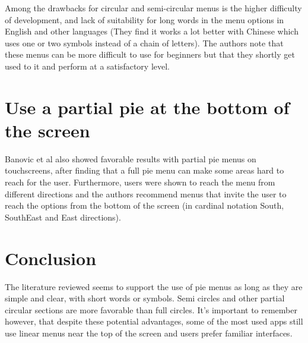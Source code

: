 \documentclass{article}
\begin{document}
Among the drawbacks for circular and semi-circular menus is the higher difficulty of development, and lack of suitability for long words in the menu options in English and other languages (They find it works a lot better with Chinese which uses one or two symbols instead of a chain of letters). The authors note that these menus can be more difficult to use for beginners but that they shortly get used to it and perform at a satisfactory level.

\section{Use a partial pie at the bottom of the screen}
Banovic et al also showed favorable results with partial pie menus on touchscreens\cite{Banovic:2011:DUM:2076354.2076378}, after finding that a full pie menu can make some areas hard to reach for the user. Furthermore, users were shown to reach the menu from different directions and the authors recommend menus that invite the user to reach the options from the bottom of the screen (in cardinal notation South, SouthEast and East directions).

\section{Conclusion}

The literature reviewed seems to support the use of pie menus as long as they are simple and clear, with short words or symbols. Semi circles and other partial circular sections are more favorable than full circles. It's important to remember however, that despite these potential advantages, some of the most used apps still use linear menus near the top of the screen and users prefer familiar interfaces.



\end{document}
